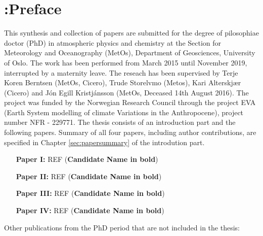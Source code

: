 \chapter*{{\color{red} :}Preface}
%
%
This synthesis and collection of papers are submitted for the degree of pilosophiae doctor (PhD) in atmospheric physics and chemistry at the Section for Meteorology and Oceanography (MetOs), Department of Geosciences, University of Oslo. The work has been performed from March 2015 until November 2019, interrupted by a maternity leave. The reseach has been supervised by Terje Koren Berntsen (MetOs, Cicero), Trude Storelvmo (Metos), Kari Alterskjær (Cicero) and J\'{o}n Egill Kristj\'{a}nsson (MetOs, Deceased 14th August 2016). The project was funded by the Norwegian Research Council through the project EVA (Earth System modelling of climate Variations in the Anthropocene), project number NFR - 229771. The thesis consists of an introduction part and the following papers. Summary of all four papers, including author contributions, are specified in Chapter \ref{sec:papersummary} of the introdution part.\\

\begin{enumerate}
\item[\textbf{Paper I:}] REF (\textbf{Candidate Name in bold})

\item[\textbf{Paper II:}] REF (\textbf{Candidate Name in bold})

\item[\textbf{Paper III:}]  REF (\textbf{Candidate Name in bold})

\item[\textbf{Paper IV:}] REF (\textbf{Candidate Name in bold})
\end{enumerate}


%
%
\vskip1.0cm
Other publications from the PhD period that are not included in the thesis:
\smallskip

